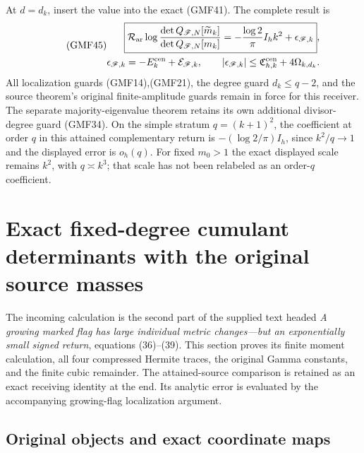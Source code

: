 At \(d=d_k\), insert the value into the exact (GMF41).
The complete result is
\begin{equation}\tag{GMF45}
\begin{split}
 \boxed{
 \mathcal R_{\rm ar}
 \log\frac{\det Q_{\mathscr F,N}[\widetilde m_k]}
              {\det Q_{\mathscr F,N}[m_k]}
 =-\frac{\log2}{\pi}I_h k^2+\epsilon_{\mathscr F,k}},\\
 \epsilon_{\mathscr F,k}=-E_k^{\rm cen}+\mathcal E_{\mathscr F,k},
 \qquad
 |\epsilon_{\mathscr F,k}|
 \le\mathfrak C_{h,k}^{\rm cen}+4\Omega_{k,d_k}.
\end{split}
\end{equation}
All localization guards (GMF14),(GMF21), the degree
guard \(d_k\le q-2\), and the source theorem's original
finite-amplitude guards remain in force for this receiver.
The separate majority-eigenvalue theorem retains its
own additional divisor-degree guard (GMF34).
On the simple stratum \(q=(k+1)^2\), the coefficient at
order \(q\) in this attained complementary return is
\(-(\log2/\pi)I_h\), since \(k^2/q\to1\) and the displayed
error is \(o_h(q)\).
For fixed \(m_0>1\) the exact displayed scale remains
\(k^2\), with \(q\asymp k^3\); that scale has not been
relabeled as an order-\(q\) coefficient.

\section{Exact fixed-degree cumulant determinants with the original source masses}
\label{a02gmf:sec:FCD}

The incoming calculation is the second part of the supplied text headed
\emph{A growing marked flag has large individual metric changes---but an
exponentially small signed return}, equations (36)--(39).
This section proves its finite moment calculation, all four compressed
Hermite traces, the original Gamma constants, and the finite cubic
remainder. The attained-source comparison is retained as an exact receiving
identity at the end. Its analytic error is evaluated by the accompanying
growing-flag localization argument.

\subsection{Original objects and exact coordinate maps}

